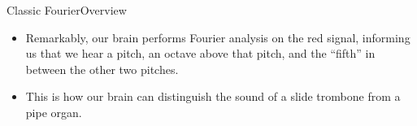 \begin{frame}{Classic Fourier}{Overview}
\Vskip{-3em}
\Vskip{-1.5em}\begin{itemize}
    \item Remarkably, our brain performs Fourier analysis on the red signal, informing us that we hear a pitch, an octave above that pitch, and the ``fifth'' in between the other two pitches.
    \item This is how our brain can distinguish the sound of a slide trombone from a pipe organ.
   
\end{itemize}

\end{frame}
